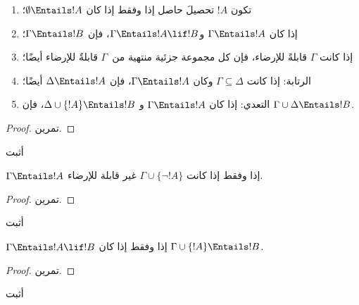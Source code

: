 \documentclass[../../../include/open-logic-section]{subfiles}
\begin{document}
\begin{prop}
\begin{enumerate}
\item تكون $!A$ تحصيلَ حاصل إذا وفقط إذا كان
  $\emptyset \Entails !A$؛
\item إذا كان $\Gamma \Entails !A$ و$\Gamma \Entails !A \lif !B$، فإن
  $\Gamma \Entails !B$؛
\item إذا كانت $\Gamma$ قابلةً للإرضاء، فإن كل مجموعة جزئية منتهية
  من~$\Gamma$ قابلةٌ للإرضاء أيضًا؛
\item {} الرتابة: إذا كانت $\Gamma \subseteq \Delta$
  وكان $\Gamma \Entails !A$، فإن $\Delta \Entails !A$ أيضًا؛
\item {} التعدي: إذا كان $\Gamma \Entails !A$ و
  $\Delta \cup \{ !A\} \Entails !B$، فإن $\Gamma \cup \Delta \Entails
  !B$.
\end{enumerate}
\end{prop}

\begin{proof}
تمرين.
\end{proof}

\begin{prob}
أثبت 
\end{prob}

\begin{prop}
  $\Gamma \Entails !A$ إذا وفقط إذا كانت $\Gamma \cup \{\lnot !A\}$
  غير قابلة للإرضاء.
\end{prop}

\begin{proof}
تمرين.
\end{proof}

\begin{prob}
أثبت 
\end{prob}

\begin{thm}
   $\Gamma \Entails !A \lif !B$ إذا وفقط
  إذا كان $\Gamma \cup \{!A\} \Entails !B$.
\end{thm}

\begin{proof}
تمرين.
\end{proof}

\begin{prob}
أثبت 
\end{prob}
\end{document}
